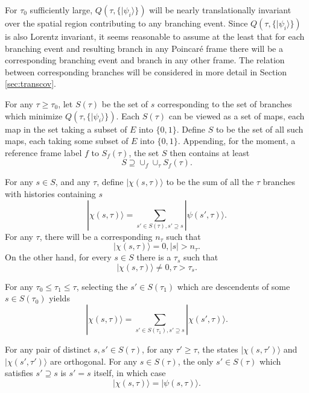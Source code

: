 \documentclass[12pt,amsmath,amssymb,onecolumn]{revtex4-2}
\begin{document}
For $\tau_0$ sufficiently large, $Q(\tau, \{|\psi_i \rangle \})$
will be nearly translationally invariant over the spatial
region contributing to any branching event.
Since $Q(\tau, \{|\psi_i \rangle \})$ is also Lorentz
invariant, it seems reasonable to assume at the least
that for each
branching event and resulting branch in any Poincar\'{e}
frame there will be a corresponding branching event
and branch in any other frame.
The relation between corresponding branches
will be considered in more detail in Section \ref{sec:transcov}.


For any $\tau \ge \tau_0$, let $S(\tau)$
be the set of $s$ corresponding to
the set of branches
which minimize $Q(\tau, \{|\psi_i \rangle \})$.
Each $S(\tau)$ can be viewed as a
set of maps, each map in the set taking a subset of $E$ into
$\{0,1\}$.
Define $S$ to be the set of all such 
maps, each taking some subset of
$E$ into $\{ 0, 1\}$. Appending, for the moment,
a reference frame label $f$ to
$S_f( \tau)$, the set $S$ then contains at least
\begin{equation}
  \label{lowerboundons}
  S \supseteq \cup_f \cup_{\tau} S_f( \tau).
  \end{equation}


For any $s \in S$, and any $\tau$,
define $|\chi( s, \tau) \rangle $ to be the sum of all the
$\tau$ branches with histories containing $s$
\begin{equation}
  \label{defhatchi}
  |\chi(s, \tau) \rangle  = \sum_{s' \in S(\tau), s' \supseteq s}| \psi( s', \tau) \rangle .
\end{equation}
For any $\tau$, there will be a corresponding $n_\tau$ such that
\begin{equation}
  \label{defnt}
  |\chi( s, \tau) \rangle  = 0, |s| > n_\tau.
\end{equation}
On the other hand, for every $s \in S$ there is a $\tau_s$ such that
\begin{equation}
  \label{defnt1}
  |\chi( s, \tau) \rangle  \ne 0, \tau > {\tau}_s.
\end{equation}

For any $\tau_0 \le \tau_1 \le \tau$,  
selecting the $s' \in S( \tau_1)$ which are descendents of
some $s \in S( \tau_0)$ yields 
\begin{equation}
  \label{defhatchi1}
  |\chi(s, \tau) \rangle  = \sum_{s' \in S(\tau_1), s' \supseteq s}| \chi( s', \tau) \rangle .
\end{equation}

For any pair of distinct $s, s' \in S( \tau)$, for any $\tau' \ge \tau$,
the states $|\chi( s, \tau') \rangle $
and $|\chi( s', \tau') \rangle $ are orthogonal.
For any $s \in S(\tau)$, the only $s' \in S(\tau)$
which satisfies $s' \supseteq s$ is $s' = s$ itself, in
which case
\begin{equation}
  \label{trivialcase}
  |\chi(s, \tau) \rangle  = |\psi(s, \tau) \rangle .
\end{equation}
\end{document}
